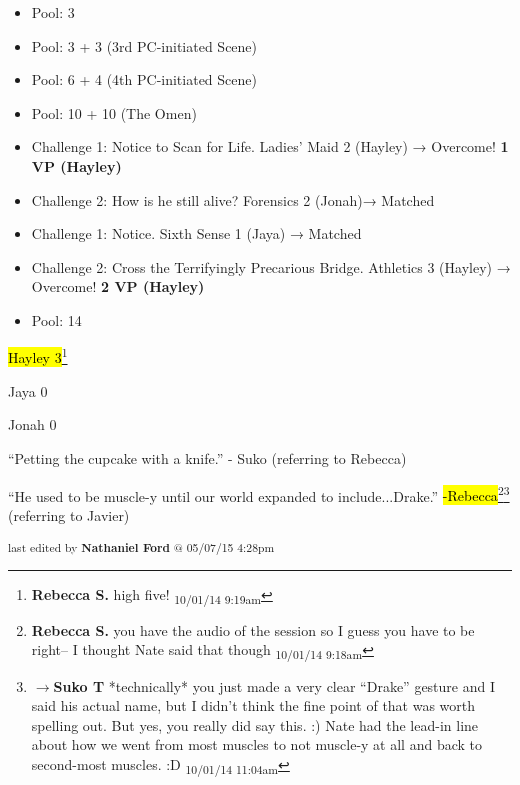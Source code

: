 \begin{itemize}
\item Pool: 3
\item Pool: 3 + 3 (3rd PC-initiated Scene)
\item Pool: 6 + 4 (4th PC-initiated Scene)
\item Pool: 10 + 10 (The Omen)
\item Challenge 1: Notice to Scan for Life.  Ladies' Maid 2 (Hayley) → Overcome! \textbf{1 VP (Hayley)}
\item Challenge 2:  How is he still alive?  Forensics 2 (Jonah)→ Matched
\item Challenge 1: Notice.  Sixth Sense 1 (Jaya) → Matched 
\item Challenge 2: Cross the Terrifyingly Precarious Bridge.  Athletics 3 (Hayley) → Overcome! \textbf{2 VP (Hayley)}
\item Pool: 14
\end{itemize}





\hl{Hayley 3}\footnote{\textbf{Rebecca S. }high five! \textsubscript{10/01/14 9:19am}}

Jaya 0

Jonah 0





``Petting the cupcake with a knife.'' - Suko (referring to Rebecca)



``He used to be muscle-y until our world expanded to include...Drake.'' \hl{-Rebecca}\footnote{\textbf{Rebecca S. }you have the audio of the session so I guess you have to be right-- I thought Nate said that though \textsubscript{10/01/14 9:18am}}\footnote{$\rightarrow$\textbf{Suko T }*technically* you just made a very clear ``Drake'' gesture and I said his actual name, but I didn't think the fine point of that was worth spelling out.  But yes, you really did say this. :) Nate had the lead-in line about how we went from most muscles to not muscle-y at all and back to second-most muscles. :D \textsubscript{10/01/14 11:04am}} (referring to Javier)


\vspace{\fill}

\begin{flushright}
\textsubscript{last edited by \textbf{Nathaniel Ford} @ 05/07/15 4:28pm}
\end{flushright}


